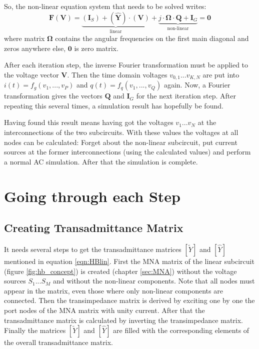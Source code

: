 \addvspace{12pt}

So, the non-linear equation system that needs to be solved writes:
\begin{equation}
\label{eqn:HBeqn}
\textbf{F}(\textbf{V})
  = \underbrace{(\boldsymbol{I}_S) + (\boldsymbol{\hat{Y}})\cdot (\boldsymbol{V})}_{\text{linear}}
  + \underbrace{j\cdot \boldsymbol{\Omega}\cdot \boldsymbol{Q} + \boldsymbol{I}_G}_{\text{non-linear}}
  = \boldsymbol{0}
\end{equation}
where matrix $\boldsymbol{\Omega}$ contains the angular frequencies
on the first main diagonal and zeros anywhere else, $\boldsymbol{0}$
is zero matrix.

\addvspace{12pt}

After each iteration step, the inverse Fourier transformation must
be applied to the voltage vector $\boldsymbol{V}$. Then the time domain
voltages $v_{0,1}...v_{K,N}$ are put into $i(t) = f_g(v_1, ..., v_P)$
and $q(t) = f_q(v_1, ..., v_Q)$ again. Now, a Fourier transformation
gives the vectors $\boldsymbol{Q}$ and $\boldsymbol{I}_G$ for the
next iteration step. After repeating this several times, a simulation
result has hopefully be found.

\addvspace{12pt}

Having found this result means having got the voltages $v_1...v_N$ at
the interconnections of the two subcircuits. With these values the
voltages at all nodes can be calculated: Forget about the non-linear
subcircuit, put current sources at the former interconnections (using
the calculated values) and perform a normal AC simulation. After that
the simulation is complete.

\section{Going through each Step}

\subsection{Creating Transadmittance Matrix}

It needs several steps to get the transadmittance matrices $[\tilde{Y}]$
and $[\hat{Y}]$ mentioned in equation \eqref{eqn:HBlin}. First the MNA
matrix of the linear subcircuit (figure \ref{fig:hb_concept}) is created
(chapter \ref{sec:MNA}) without the voltage sources $S_1$...$S_M$ and
without the non-linear components. Note that all nodes must appear in the
matrix, even those where only non-linear components are connected. Then
the transimpedance matrix is derived by
exciting one by one the port nodes of the MNA matrix with unity current.
After that the transadmittance matrix is calculated by inverting the
transimpedance matrix. Finally the matrices $[\tilde{Y}]$ and $[\hat{Y}]$
are filled with the corresponding elements of the overall transadmittance
matrix.

